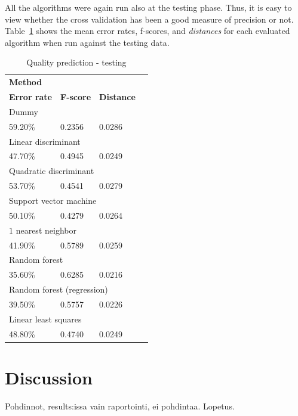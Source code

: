 \documentclass[twoside]{article}
\begin{document}
\begin{multicols}{2}
All the algorithms were again run also at the testing phase. Thus, it is easy to view whether the cross validation has been a good measure of precision or not.
Table~\ref{table:quality_testing} shows the mean error rates, f-scores, and \emph{distances} for each evaluated algorithm when run against the testing data.

\begin{table}[H]
\caption{Quality prediction - testing}
\label{table:quality_testing}
\centering
\begin{tabular}{llll}
\multicolumn{3}{l}{\textbf{Method}} \\
\textbf{Error rate} & \textbf{F-score} & \textbf{Distance} \\
\midrule
\multicolumn{3}{l}{Dummy} \\
59.20\% & 0.2356 & 0.0286 \\
\multicolumn{3}{l}{Linear discriminant} \\
47.70\% & 0.4945 & 0.0249 \\
\multicolumn{3}{l}{Quadratic discriminant} \\
53.70\% & 0.4541 & 0.0279 \\
\multicolumn{3}{l}{Support vector machine} \\
50.10\% & 0.4279 & 0.0264 \\
\multicolumn{3}{l}{$1$ nearest neighbor} \\
41.90\% & 0.5789 & 0.0259 \\
\multicolumn{3}{l}{Random forest} \\
35.60\% & 0.6285 & 0.0216 \\
\multicolumn{3}{l}{Random forest (regression)} \\
39.50\% & 0.5757 & 0.0226 \\
\multicolumn{3}{l}{Linear least squares} \\
48.80\% & 0.4740 & 0.0249 \\
\end{tabular}
\end{table}


\section{Discussion}

Pohdinnot, results:issa vain raportointi, ei pohdintaa. Lopetus.



\end{multicols}
\end{document}
